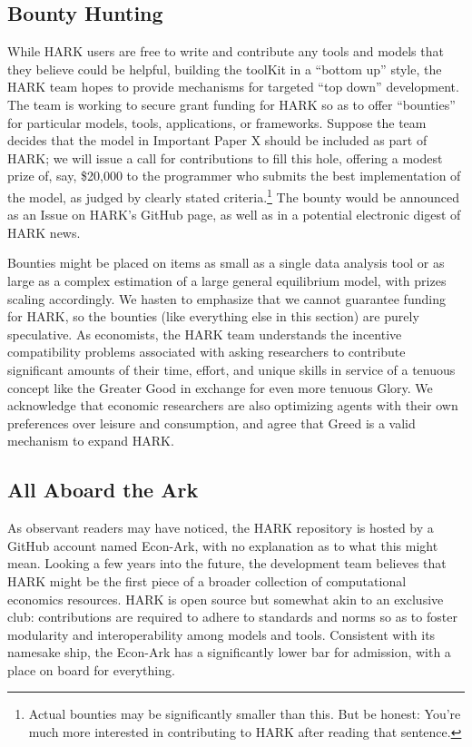 \documentclass[12pt,titlepage,letterpaper]{econtex}
\begin{document}
{\subsection{Bounty Hunting}\label{sec:BountyHunting}

While HARK users are free to write and contribute any tools and models that they believe could be helpful, building the toolKit in a ``bottom up'' style, the HARK team hopes to provide mechanisms for targeted ``top down'' development.  The team is working to secure grant funding for HARK so as to offer ``bounties'' for particular models, tools, applications, or frameworks.  Suppose the team decides that the model in Important Paper X should be included as part of HARK; we will issue a call for contributions to fill this hole, offering a modest prize of, say, \$20,000 to the programmer who submits the best implementation of the model, as judged by clearly stated criteria.\footnote{Actual bounties may be significantly smaller than this.  But be honest: You're much more interested in contributing to HARK after reading that sentence.}  The bounty would be announced as an Issue on HARK's GitHub page, as well as in a potential electronic digest of HARK news.

Bounties might be placed on items as small as a single data analysis tool or as large as a complex estimation of a large general equilibrium model, with prizes scaling accordingly.  We hasten to emphasize that we cannot guarantee funding for HARK, so the bounties (like everything else in this section) are purely speculative.  As economists, the HARK team understands the incentive compatibility problems associated with asking researchers to contribute significant amounts of their time, effort, and unique skills in service of a tenuous concept like the Greater Good in exchange for even more tenuous Glory.  We acknowledge that economic researchers are also optimizing agents with their own preferences over leisure and consumption, and agree that Greed is a valid mechanism to expand HARK. 

\subsection{All Aboard the Ark}\label{sec:AllAboardTheArk}

As observant readers may have noticed, the HARK repository is hosted by a GitHub account named Econ-Ark, with no explanation as to what this might mean.  Looking a few years into the future, the development team believes that HARK might be the first piece of a broader collection of computational economics resources.  HARK is open source but somewhat akin to an exclusive club: contributions are required to adhere to standards and norms so as to foster modularity and interoperability among models and tools.  Consistent with its namesake ship, the Econ-Ark has a significantly lower bar for admission, with a place on board for everything.

}
\end{document}
